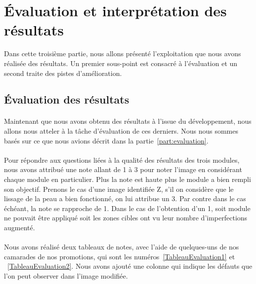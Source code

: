 \documentclass[11pt, french,screen]{report-rd-info}
\begin{document}
\section{Évaluation et interprétation des résultats}
Dans cette troisième partie, nous allons présenté l'exploitation que nous avons réalisée des résultats. Un premier sous-point est consacré à l'évaluation et un second traite des pistes d'amélioration.

\subsection{Évaluation des résultats}
\paragraph*{}
Maintenant que nous avons obtenu des résultats à l'issue du développement, nous allons nous atteler à la tâche d'évaluation de ces derniers. Nous nous sommes basés sur ce que nous avions décrit dans la partie~\ref{part:evaluation}. 

\paragraph*{}
Pour répondre aux questions liées à la qualité des résultats des trois modules, nous avons attribué une note allant de 1 à 3 pour noter l'image en considérant chaque module en particulier. Plus la note est haute plus le module a bien rempli son objectif. Prenons le cas d'une image identifiée Z, s'il on considère que le lissage de la peau a bien fonctionné, on lui attribue un 3. Par contre dans le cas échéant, la note se rapproche de 1. Dans le cas de l'obtention d'un 1, soit module ne pouvait être appliqué soit les zones cibles ont vu leur nombre d'imperfections augmenté.

\paragraph*{}
Nous avons réalisé deux tableaux de notes, avec l'aide de quelques-uns de nos camarades de nos promotions, qui sont les numéros~\ref{TableauEvaluation1} et ~\ref{TableauEvaluation2}. Nous avons ajouté une colonne qui indique les défauts que l'on peut observer dans l'image modifiée.
\end{document}
